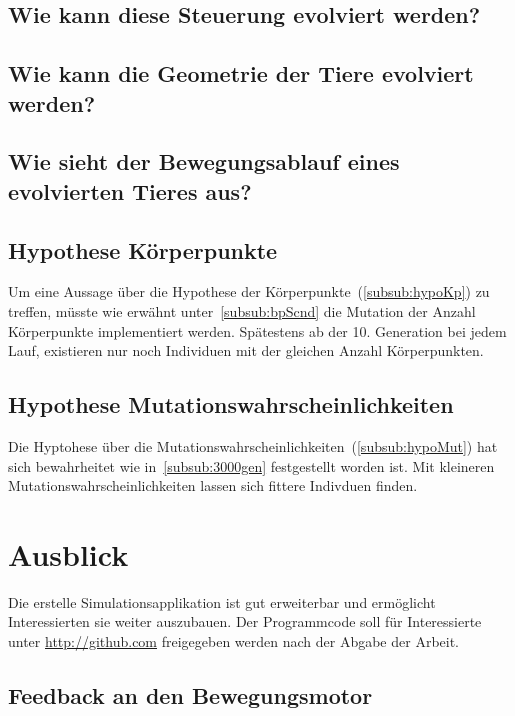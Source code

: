     \subsection{Wie kann diese Steuerung evolviert werden?}

    \subsection{Wie kann die Geometrie der Tiere evolviert werden?}

    \subsection{Wie sieht der Bewegungsablauf eines evolvierten Tieres aus?}

    \subsection{Hypothese Körperpunkte}

      Um eine Aussage über die Hypothese der Körperpunkte~(\vref{subsub:hypoKp}) zu treffen,
      müsste wie erwähnt unter~\vref{subsub:bpScnd} die Mutation der Anzahl Körperpunkte implementiert werden.
      Spätestens ab der 10. Generation bei jedem Lauf,
      existieren nur noch Individuen mit der gleichen Anzahl Körperpunkten.

    \subsection{Hypothese Mutationswahrscheinlichkeiten}

      Die Hyptohese über die Mutationswahrscheinlichkeiten~(\vref{subsub:hypoMut}) hat sich bewahrheitet
      wie in~\vref{subsub:3000gen} festgestellt worden ist.
      Mit kleineren Mutationswahrscheinlichkeiten lassen sich fittere Indivduen finden.

  \section{Ausblick\label{sec:ausblick}}


    Die erstelle Simulationsapplikation ist gut erweiterbar und ermöglicht Interessierten sie weiter auszubauen.
    Der Programmcode soll für Interessierte unter \url{http://github.com} freigegeben werden nach der Abgabe der Arbeit.

    \subsection{Feedback an den Bewegungsmotor\label{sec:PerspectiveFeedback}}

